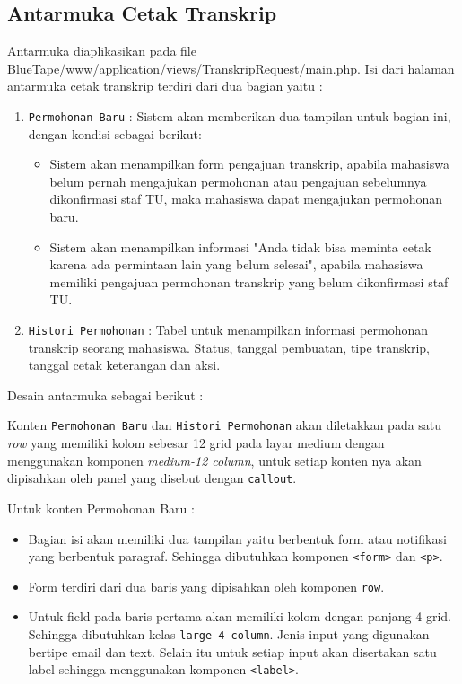 \documentclass[a4paper,twoside]{article}
\begin{document}
\begin{enumerate}
		\subsection{Antarmuka Cetak Transkrip}
		Antarmuka diaplikasikan pada file BlueTape/www/application/views/TranskripRequest/main.php. Isi dari halaman antarmuka cetak transkrip terdiri dari dua bagian yaitu :
		\begin{enumerate}
			\item \verb|Permohonan Baru| : Sistem akan memberikan dua tampilan untuk bagian ini, dengan kondisi sebagai berikut:
			\begin{itemize}
				\item Sistem akan menampilkan form pengajuan transkrip, apabila mahasiswa belum pernah mengajukan permohonan atau pengajuan sebelumnya  dikonfirmasi staf TU, maka mahasiswa dapat mengajukan permohonan baru.
				\item Sistem akan menampilkan informasi "Anda tidak bisa meminta cetak karena ada permintaan lain yang belum selesai", apabila mahasiswa memiliki pengajuan permohonan transkrip yang belum dikonfirmasi staf TU. 
			\end{itemize}
			\item \verb|Histori Permohonan| : Tabel untuk menampilkan informasi permohonan transkrip seorang mahasiswa. Status, tanggal pembuatan, tipe transkrip, tanggal cetak keterangan dan aksi. 
		\end{enumerate}
		Desain antarmuka sebagai berikut : \par
		Konten \texttt{Permohonan Baru} dan \texttt{Histori Permohonan} akan diletakkan pada satu \textit{row} yang memiliki kolom sebesar 12 grid pada layar medium dengan menggunakan komponen \textit{medium-12 column}, untuk setiap konten nya akan dipisahkan oleh panel yang disebut dengan \texttt{callout}. \par
		Untuk konten Permohonan Baru :
		\begin{itemize}
			\item Bagian isi akan memiliki dua tampilan yaitu berbentuk form atau notifikasi yang berbentuk paragraf. Sehingga dibutuhkan komponen \verb|<form>| dan \verb|<p>|.
			\item Form terdiri dari dua baris yang dipisahkan oleh komponen \texttt{row}.
			\item Untuk field pada baris pertama akan memiliki kolom dengan panjang 4 grid. Sehingga dibutuhkan kelas \verb|large-4 column|. Jenis input yang digunakan bertipe email dan text. Selain itu untuk setiap input akan disertakan satu label sehingga menggunakan komponen \texttt{<label>}.

\end{itemize}
\end{enumerate}
\end{document}
